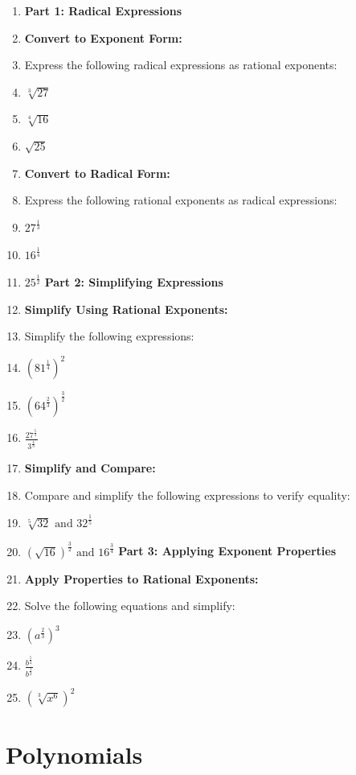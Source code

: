 \begin{enumerate}
    \item \textbf{Part 1: Radical Expressions}
    \item \textbf{Convert to Exponent Form:}
    \item Express the following radical expressions as rational exponents:
    \item $\sqrt[3]{27}$
    \item $\sqrt[4]{16}$
    \item $\sqrt{25}$
    \item \textbf{Convert to Radical Form:}
    \item Express the following rational exponents as radical expressions:
    \item $27^{\frac{1}{3}}$
    \item $16^{\frac{1}{4}}$
    \item $25^{\frac{1}{2}}$ \textbf{Part 2: Simplifying Expressions}
    \item \textbf{Simplify Using Rational Exponents:}
    \item Simplify the following expressions:
    \item $\left(81^{\frac{1}{4}}\right)^2$
    \item $\left(64^{\frac{2}{3}}\right)^{\frac{3}{2}}$
    \item $\frac{27^{\frac{5}{3}}}{3^{\frac{4}{3}}}$
    \item \textbf{Simplify and Compare:}
    \item Compare and simplify the following expressions to verify equality:
    \item $\sqrt[5]{32} \text{ and } 32^{\frac{1}{5}}$
    \item $\left(\sqrt{16}\right)^{\frac{3}{2}} \text{ and } 16^{\frac{3}{4}}$ \textbf{Part 3: Applying Exponent Properties}
    \item \textbf{Apply Properties to Rational Exponents:}
    \item Solve the following equations and simplify:
    \item $\left(a^{\frac{2}{3}}\right)^3$
    \item $\frac{b^{\frac{5}{2}}}{b^{\frac{1}{2}}}$
    \item $\left(\sqrt[3]{x^6}\right)^{2}$
\end{enumerate}

\section{Polynomials}
\label{sec:polynomials}

